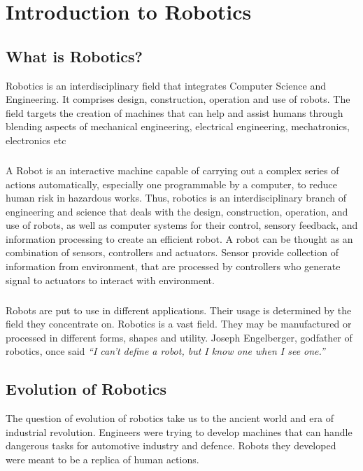 \chapter{Introduction to Robotics}

\section{What is Robotics?}
\par Robotics is an interdisciplinary field that integrates Computer Science and Engineering. It comprises design, construction, operation and use of robots. The field targets the creation of machines that can help and assist humans through blending aspects of mechanical engineering, electrical engineering, mechatronics, electronics etc
\paragraph{ } A Robot is an interactive machine capable of carrying out a complex series of actions automatically, especially one programmable by a computer, to reduce human risk in hazardous works. Thus, robotics is an interdisciplinary branch of engineering and science that deals with the design, construction, operation, and use of robots, as well as computer systems for their control, sensory feedback, and information processing to create an efficient robot. A robot can be thought as an combination of sensors, controllers and actuators. Sensor provide collection of information from environment, that are processed by controllers who generate signal to actuators to interact with environment.
\paragraph{ } Robots are put to use in different applications. Their usage is determined by the field they concentrate on. Robotics is a vast field. They may be manufactured or processed in different forms, shapes and utility. Joseph Engelberger, godfather of robotics, once said \textit{“I can't define a robot, but I know one when I see one.”}

\section{Evolution of Robotics}
\par The question of evolution of robotics take us to the ancient world and era of industrial revolution. Engineers were trying to develop machines that can handle dangerous tasks for automotive industry and defence. Robots they developed were meant to be a replica of human actions.

